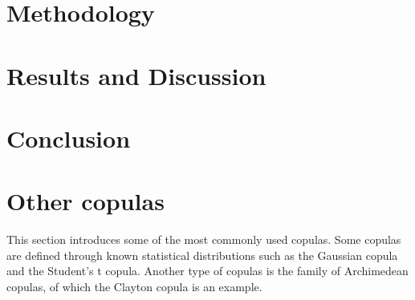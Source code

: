 \documentclass[%
a4paper,							
11pt,								
bibliography=totoc,						
abstracton=true					
]
{scrartcl}
\theoremstyle{plain}
\theoremstyle{definition}
\theoremstyle{remark}
\newcommand{\1}{\mathbbm{1}}
\begin{document}
\section{Methodology}\label{sec:Method}



\section{Results and Discussion}\label{sec:Results}



\section{Conclusion}\label{sec:Conclusion}


\newpage
\appendix

\printbibliography


\section{Other copulas}\label{sec:OtherCopulas}
This section introduces some of the most commonly used copulas. Some copulas are defined through known statistical distributions such as the Gaussian copula and the Student's t copula. Another type of copulas is the family of Archimedean copulas, of which the Clayton copula is an example.
\end{document}
